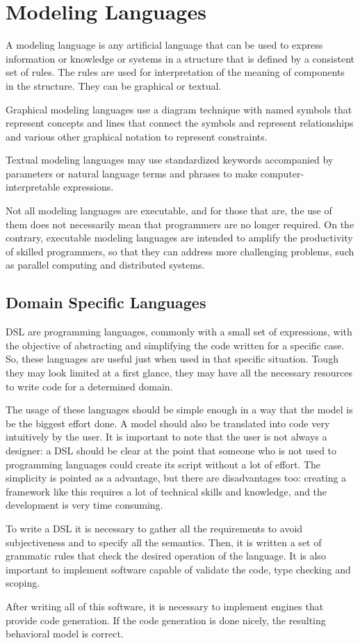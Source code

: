 \documentclass{report}
\begin{document}
	\section{Modeling Languages}
	\par A modeling language is any artificial language that can be used to express information or knowledge or systems in a structure that is defined by a consistent set of rules. The rules are used for interpretation of the meaning of components in the structure. They can be graphical or textual.
	\par Graphical modeling languages use a diagram technique with named symbols that represent concepts and lines that connect the symbols and represent relationships and various other graphical notation to represent constraints.
	\par Textual modeling languages may use standardized keywords accompanied by parameters or natural language terms and phrases to make computer-interpretable expressions.
	\par Not all modeling languages are executable, and for those that are, the use of them does not necessarily mean that programmers are no longer required. On the contrary, executable modeling languages are intended to amplify the productivity of skilled programmers, so that they can address more challenging problems, such as parallel computing and distributed systems\cite{wikipedia}.
		
		\subsection{Domain Specific Languages}
		
		\par DSL are programming languages, commonly with a small set of expressions, with the objective of abstracting and simplifying the code written for a specific case. So, these languages are useful just when used in that specific situation. Tough they may look limited at a first glance, they may have all the necessary resources to write code for a determined domain.
		\par The usage of these languages should be simple enough in a way that the model is be the biggest effort done. A model should also be translated into code very intuitively by the user. It is important to note that the user is not always a designer: a DSL should be clear at the point that someone who is not used to programming languages could create its script without a lot of effort. The simplicity is pointed as a advantage, but there are disadvantages too: creating a framework like this requires a lot of technical skills and knowledge, and the development is very time consuming.
		\par To write a DSL it is necessary to gather all the requirements to avoid subjectiveness and to specify all the semantics. Then, it is written a set of grammatic rules that check the desired operation of the language. It is also important to implement software capable of validate the code, type checking and scoping.
		\par After writing all of this software, it is necessary to implement engines that provide code generation. If the code generation is done nicely, the resulting behavioral model is correct.
		
\end{document}
